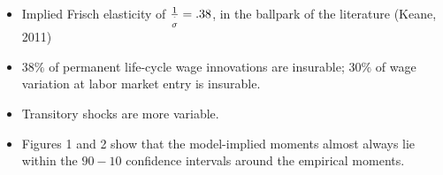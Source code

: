 \documentclass[notes=show]{beamer}
\begin{document}
\begin{frame}%


\begin{itemize}
\item Implied Frisch elasticity of $\frac{1}{\overset{\symbol{94}}{\sigma }}%
=.38$, in the ballpark of the literature (Keane, 2011)

\item $38\%$ of permanent life-cycle wage innovations are insurable; $30\%$
of wage variation at labor market entry is insurable.

\item Transitory shocks are more variable.

\item Figures 1 and 2 show that the model-implied moments almost always lie
within the $90-10$ confidence intervals around the empirical moments.
\end{itemize}

\transboxout%
\end{frame}%

\bigskip

\begin{frame}%


\begin{center}
\end{center}

\transboxout%
\end{frame}%
\end{document}
